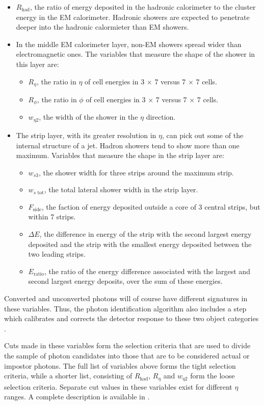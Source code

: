 \begin{itemize}
\item $R_\text{had}$, the ratio of energy deposited in the hadronic calorimeter to the cluster energy in the EM calorimeter. Hadronic showers are expected to penetrate deeper into the hadronic calormieter than EM showers.
\item In the middle EM calorimeter layer, non-EM showers spread wider than electromagnetic ones. The variables that measure the shape of the shower in this layer are:
\begin{itemize}
\item $R_\eta$, the ratio in $\eta$ of cell energies in 3 $\times$ 7 versus 7 $\times$ 7 cells.
\item $R_\phi$, the ratio in $\phi$ of cell energies in 3 $\times$ 7 versus 7 $\times$ 7 cells.
\item $w_{\eta 2}$, the width of the shower in the $\eta$ direction.
\end{itemize}
\item The strip layer, with its greater resolution in $\eta$, can pick out some of the internal structure of a jet. Hadron showers tend to show more than one maximum. Variables that measure the shape in the strip layer are:
\begin{itemize}
\item $w_{s3}$, the shower width for three strips around the maximum strip.
\item $w_{s\text{ tot}}$, the total lateral shower width in the strip layer.
\item $F_\text{side}$, the faction of energy deposited outside a core of 3 central strips, but within 7 strips.
\item $\Delta E$, the difference in energy of the strip with the second largest energy deposited and the strip with the smallest energy deposited between the two leading strips.
\item $E_\text{ratio}$, the ratio of the energy difference associated with the
largest and second largest energy deposits, over the sum of these energies.
\end{itemize}
\end{itemize}

Converted and unconverted photons will of course have different signatures in these variables. Thus, the photon identification algorithm also includes a step which calibrates and corrects the detector response to these two object categories \cite{phorec}.

Cuts made in these variables form the selection criteria that are used to divide the sample of photon candidates into those that are to be considered actual or impostor photons. The full list of variables above forms the tight selection criteria, while a shorter list, consisting of $R_\text{had}$, $R_\eta$ and $w_{\eta2}$ form the loose selection criteria. Separate cut values in these variables exist for different $\eta$ ranges. A complete description is available in \cite{Carminati}.

